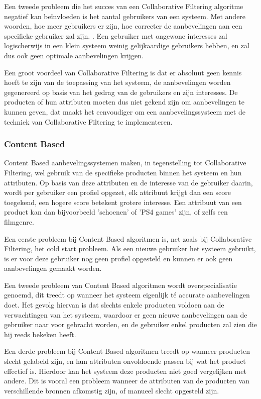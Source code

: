 Een tweede probleem die het succes van een Collaborative Filtering algoritme negatief kan beïnvloeden is het aantal gebruikers van een systeem. Met andere woorden, hoe meer gebruikers er zijn, hoe correcter de aanbevelingen aan een specifieke gebruiker zal zijn. \autocite{Sarwar2001}. Een gebruiker met ongewone interesses zal logischerwijs in een klein systeem weinig gelijkaardige gebruikers hebben, en zal dus ook geen optimale aanbevelingen krijgen.

Een groot voordeel van Collaborative Filtering is dat er absoluut geen kennis hoeft te zijn van de toepassing van het systeem, de aanbevelingen worden gegenereerd op basis van het gedrag van de gebruikers en zijn interesses. De producten of hun attributen moeten dus niet gekend zijn om aanbevelingen te kunnen geven, dat maakt het eenvoudiger om een aanbevelingssysteem met de techniek van Collaborative Filtering te implementeren.

\subsubsection{Content Based}
\label{sec:Content Based}

Content Based aanbevelingssystemen \autocite{Lops2011} maken, in tegenstelling tot Collaborative Filtering, wel gebruik van de specifieke producten binnen het systeem en hun attributen. Op basis van deze attributen en de interesse van de gebruiker daarin, wordt per gebruiker een profiel opgezet, elk attribuut krijgt dan een score toegekend, een hogere score betekent grotere interesse. Een attribuut van een product kan dan bijvoorbeeld 'schoenen' of 'PS4 games' zijn, of zelfs een filmgenre.

Een eerste probleem bij Content Based algoritmen is, net zoals bij Collaborative Filtering, het cold start probleem. Als een nieuwe gebruiker het systeem gebruikt, is er voor deze gebruiker nog geen profiel opgesteld en kunnen er ook geen aanbevelingen gemaakt worden.

\newpage
Een tweede probleem van Content Based algoritmen wordt overspecialisatie genoemd, dit treedt op wanneer het systeem eigenlijk té accurate aanbevelingen doet. Het gevolg hiervan is dat slechts enkele producten voldoen aan de verwachtingen van het systeem, waardoor er geen nieuwe aanbevelingen aan de gebruiker naar voor gebracht worden, en de gebruiker enkel producten zal zien die hij reeds bekeken heeft. 

Een derde probleem bij Content Based algoritmen treedt op wanneer producten slecht gelabeld zijn, en hun attributen onvoldoende passen bij wat het product effectief is. Hierdoor kan het systeem deze producten niet goed vergelijken met andere. Dit is vooral een probleem wanneer de attributen van de producten van verschillende bronnen afkomstig zijn, of manueel slecht opgesteld zijn.

